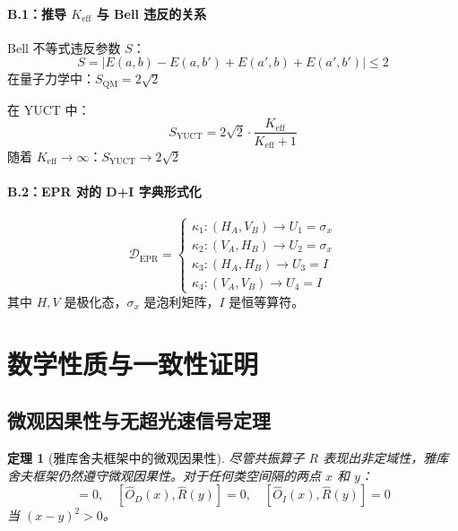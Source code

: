 \documentclass[11pt,a4paper]{article}
\newtheorem{theorem}{定理}
\begin{document}
	\paragraph{B.1：推导 $K_{\mathrm{eff}}$ 与 Bell 违反的关系}
	Bell 不等式违反参数 $S$：
	\begin{equation}
		S = |E(a,b) - E(a,b') + E(a',b) + E(a',b')| \leq 2
	\end{equation}
	在量子力学中：$S_{\text{QM}} = 2\sqrt{2}$
	
	在 YUCT 中：
	\begin{equation}
		S_{\text{YUCT}} = 2\sqrt{2} \cdot \frac{K_{\mathrm{eff}}}{K_{\mathrm{eff}} + 1}
	\end{equation}
	随着 $K_{\mathrm{eff}} \to \infty$：$S_{\text{YUCT}} \to 2\sqrt{2}$
	
	\paragraph{B.2：EPR 对的 \protect\mbox{D+I} 字典形式化}
	\begin{equation}
		\mathcal{D}_{\text{EPR}} = 
		\begin{cases}
			\kappa_1: (H_A, V_B) \to U_1 = \sigma_x \\
			\kappa_2: (V_A, H_B) \to U_2 = \sigma_x \\
			\kappa_3: (H_A, H_B) \to U_3 = I \\
			\kappa_4: (V_A, V_B) \to U_4 = I
		\end{cases}
	\end{equation}
	其中 $H,V$ 是极化态，$\sigma_x$ 是泡利矩阵，$I$ 是恒等算符。
	
	\section{数学性质与一致性证明}
	\subsection{微观因果性与无超光速信号定理}
	
	\begin{theorem}[雅库舍夫框架中的微观因果性]
		尽管共振算子 $R$ 表现出非定域性，雅库舍夫框架仍然遵守微观因果性。对于任何类空间隔的两点 $x$ 和 $y$：
		\begin{equation}
			[\hat{O}_D(x), \hat{O}_I(y)] = 0, \quad [\hat{O}_D(x), \hat{R}(y)] = 0, \quad [\hat{O}_I(x), \hat{R}(y)] = 0
		\end{equation}
		当 $(x-y)^2 > 0$。
	\end{theorem}
	
\end{document}
